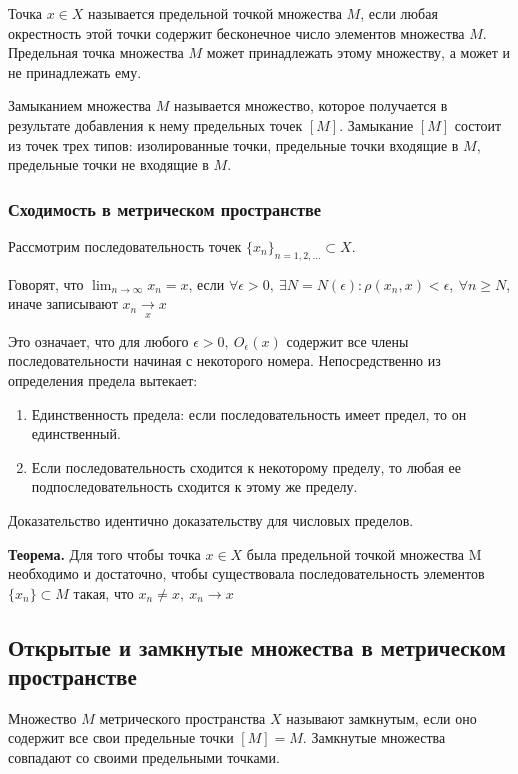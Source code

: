 \documentclass[14pt,a4paper]{extarticle}
\theoremstyle{definition}
\theoremstyle{remark}
\newcommand{\be}{\begin{enumerate}}
\newcommand{\ee}{\end{enumerate}}
\newcommand{\sep}{ , \ \allowbreak }
\renewcommand{\[}{\begin{dmath*}[compact]}
\renewcommand{\]}{\end{dmath*}}
\newcommand{\tth}[1][]{\textbf{Теорема#1.}}
\begin{document}
Точка $x \in X$ называется предельной точкой множества $M$, если любая
окрестность этой точки содержит бесконечное число элементов множества $M$.
Предельная точка множества $M$ может принадлежать этому множеству, а может
и не принадлежать ему.

Замыканием множества $M$ называется множество, которое получается в результате
добавления к нему предельных точек $[M]$.
Замыкание $[M]$ состоит из точек трех типов: изолированные точки, предельные
точки входящие в $M$, предельные точки не входящие в $M$.

\subsubsection{Сходимость в метрическом пространстве}

Рассмотрим последовательность точек $\{x_n\}_{n=1,2,\dots}\subset X$.

Говорят, что $\lim_{n \to \infty} x_n = x$, если
$\forall \epsilon > 0 \sep \exists N = N(\epsilon): \rho(x_n, x)<\epsilon \sep
\forall n \geq N$, иначе записывают $x_n\xrightarrow[x]{}x$

Это означает, что для любого $\epsilon > 0 \sep O_\epsilon(x)$ содержит все
члены последовательности начиная с некоторого номера. Непосредственно из
определения предела вытекает:

\be
  \item Единственность предела: если последовательность имеет предел,
  то он единственный.

  \item Если последовательность сходится к некоторому пределу,
  то любая ее подпоследовательность сходится к этому же пределу.
\ee

Доказательство идентично доказательству для числовых пределов.

\tth[] Для того чтобы точка $x \in X$ была предельной точкой множества M
необходимо и достаточно, чтобы существовала последовательность элементов
$\{x_n\}\subset M$ такая, что $x_n\neq x \sep x_n\to x$

\subsection{Открытые и замкнутые множества в метрическом пространстве}

Множество $M$ метрического пространства $X$ называют замкнутым, если оно
содержит все свои предельные точки $[M]=M$.
Замкнутые множества совпадают со своими предельными точками.
\end{document}
